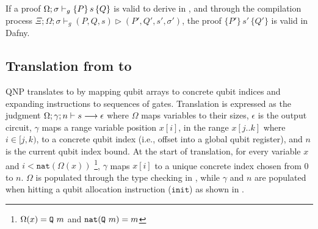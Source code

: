 \begin{theorem}\label{thm:proof-compile-dafny}\rm 
If a proof $\Omega;\sigma\vdash_{g}\{P\}\, s \,\{Q\}$ is valid to derive in \qafny, and through the compilation process $\Xi;\Omega;\sigma\vdash_g (P,Q,s) \triangleright (P',Q',s',\sigma')$, the proof $\{P'\} \, s' \,\{Q'\}$ is valid in Dafny.
\end{theorem}

\subsection{Translation from \qafny to \sqir}\label{sec:vqir-compilation}

\newcommand{\tget}{\texttt{get}}
\newcommand{\tstart}{\texttt{start}}
\newcommand{\tfst}{\texttt{fst}}
\newcommand{\tsnd}{\texttt{snd}}
\newcommand{\tucom}[1]{\texttt{ucom}~{#1}}
\newcommand{\tif}{\texttt{if}}
\newcommand{\tthen}{\texttt{then}}
\newcommand{\telse}{\texttt{else}}
\newcommand{\tlet}{\texttt{let}}
\newcommand{\tin}{\texttt{in}}

QNP translates \qafny to \sqir by mapping \qafny qubit arrays to \sqir concrete qubit indices and expanding \qafny instructions to sequences of \sqir gates.
%
%
Translation is expressed as the judgment
$\Omega;\gamma;n\vdash s \longrightarrow \epsilon$ where $\Omega$ maps \qafny variables to their sizes, 
$\epsilon$ is the output \sqir circuit, $\gamma$ maps a \qafny range variable
position $x[i]$, in the range $x[j..k]$ where $i \in [j,k)$, to a \sqir concrete qubit index (i.e., offset into a 
global qubit register), and $n$ is the current qubit index bound.  
At the start of translation, for every
variable $x$ and $i < \texttt{nat}(\Omega(x))$ \footnote{$\Omega(x)=\texttt{Q}~m$ and $\texttt{nat}(\texttt{Q}~m)=m$},
$\gamma$ maps $x[i]$ to a unique
concrete index chosen from 0 to $n$.
$\Omega$ is populated through the \qafny type checking in ,
while $\gamma$ and $n$ are populated when hitting a qubit allocation instruction ($\texttt{init}$) as shown in .

